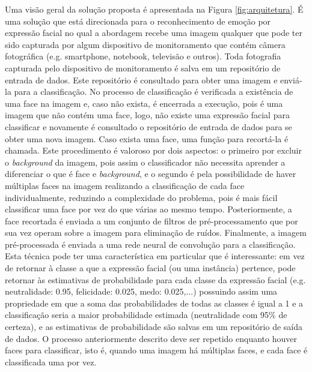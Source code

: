 Uma visão geral da solução proposta é apresentada na Figura \ref{fig:arquitetura}. É uma solução que está direcionada para o reconhecimento de emoção por expressão facial no qual a abordagem recebe uma imagem qualquer que pode ter sido capturada por algum dispositivo de monitoramento que contém câmera fotográfica (e.g. smartphone, notebook, televisão e outros). Toda  fotografia capturada pelo dispositivo de monitoramento é salva em um repositório de entrada de dados. Este repositório é consultado para obter uma imagem e enviá-la para a classificação. No processo de classificação é verificada a existência de uma face na imagem e, caso não exista, é encerrada a execução, pois é uma imagem que não contém uma face, logo, não existe uma expressão facial para classificar e novamente é consultado o repositório de entrada de dados para se obter uma nova imagem. Caso exista uma face, uma função para recortá-la é chamada. Este procedimento é valoroso por dois aspectos: o primeiro por excluir o \textit{background} da imagem, pois assim o classificador não necessita aprender a diferenciar o que é face e \textit{background}, e o segundo é pela possibilidade de haver múltiplas faces na imagem realizando a classificação de cada face individualmente, reduzindo a complexidade do problema, pois é mais fácil classificar uma face por vez do que várias ao mesmo tempo. Posteriormente, a face recortada é enviada a um conjunto de filtros de pré-processamento que por sua vez operam sobre a imagem para eliminação de ruídos. Finalmente, a imagem pré-processada é enviada a uma rede neural de convolução para a classificação. Esta técnica pode ter uma característica em particular que é interessante: em vez de retornar à classe a que a expressão facial (ou uma instância) pertence, pode retornar às estimativas de probabilidade para cada classe da expressão facial (e.g. neutralidade: 0.95, felicidade: 0.025, medo: 0.025,...) possuindo assim uma propriedade em que a soma das probabilidades de todas as classes é igual a 1 e a classificação seria a maior probabilidade estimada (neutralidade com 95\% de certeza), e as estimativas de probabilidade são salvas em um repositório de saída de dados. O processo anteriormente descrito deve ser repetido enquanto houver faces para classificar, isto é, quando uma imagem há múltiplas faces, e cada face é classificada uma por vez.



